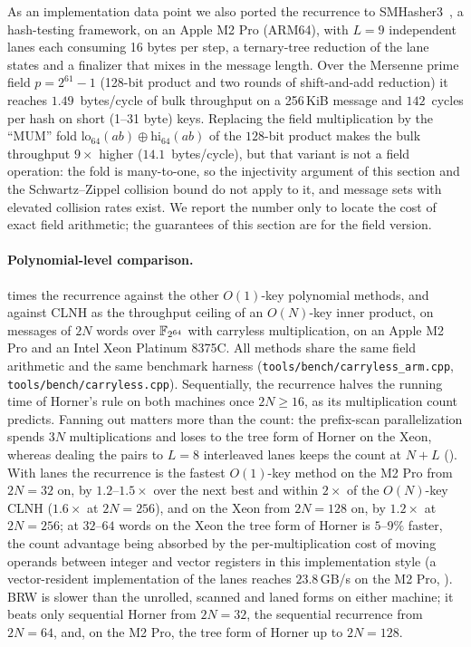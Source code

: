 As an implementation data point we also ported the recurrence to
SMHasher3~\cite{smhasher3}, a hash-testing framework, on an Apple M2 Pro
(ARM64), with $L=9$ independent lanes each consuming 16 bytes per step, a
ternary-tree reduction of the lane states and a finalizer that mixes in the
message length.  Over the Mersenne prime field $p=2^{61}-1$ (128-bit product
and two rounds of shift-and-add reduction) it reaches $1.49$~bytes/cycle of
bulk throughput on a 256\,KiB message and $142$~cycles per hash on short
(1--31 byte) keys.  Replacing the field multiplication by the ``MUM'' fold
$\mathrm{lo}_{64}(ab)\oplus\mathrm{hi}_{64}(ab)$ of the $128$-bit product makes
the bulk throughput $9\times$ higher ($14.1$~bytes/cycle), but that variant is
not a field operation: the fold is many-to-one, so the injectivity argument of
this section and the Schwartz--Zippel collision bound do not apply to it, and
message sets with elevated collision rates exist.  We report the number only to
locate the cost of exact field arithmetic; the guarantees of this section are
for the field version.

\paragraph{Polynomial-level comparison.}
 times the recurrence against the other
$O(1)$-key polynomial methods, and against CLNH as the throughput ceiling of
an $O(N)$-key inner product, on messages of $2N$ words over $\mathbb{F}_{2^{64}}$ with
carryless multiplication, on an Apple M2 Pro and an Intel Xeon Platinum 8375C.
All methods share the same field arithmetic and the same benchmark harness
(\texttt{tools/bench/carryless\_arm.cpp}, \texttt{tools/bench/carryless.cpp}).
Sequentially, the recurrence halves the running time of Horner's rule on both
machines once $2N\ge16$, as its multiplication count predicts.  Fanning out
matters more than the count: the prefix-scan parallelization spends $3N$
multiplications and loses to the tree form of Horner on the Xeon, whereas
dealing the pairs to $L=8$ interleaved lanes keeps the count at $N+L$
().  With lanes the recurrence is the fastest
$O(1)$-key method on the M2 Pro from $2N=32$ on, by $1.2$--$1.5\times$ over the
next best and within $2\times$ of the $O(N)$-key CLNH ($1.6\times$ at $2N=256$), and on the Xeon from
$2N=128$ on, by $1.2\times$ at $2N=256$; at $32$--$64$ words on the Xeon the
tree form of Horner is $5$--$9\%$ faster, the count advantage being absorbed by
the per-multiplication cost of moving operands between integer and vector
registers in this implementation style (a vector-resident implementation of
the lanes reaches $23.8$\,GB/s on the M2 Pro, ).
BRW is slower than the unrolled, scanned and laned forms on either machine; it
beats only sequential Horner from $2N=32$, the sequential recurrence from
$2N=64$, and, on the M2 Pro, the tree form of Horner up to $2N=128$.

